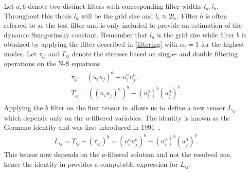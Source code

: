 Let $a,b$ denote two distinct filters with corresponding filter widths $l_a,l_b$. 
Throughout this thesis $l_a$ will be the grid size and $l_b\approx 2l_a$. Filter $b$ is
often referred to as the test filter and is only included to provide an estimation 
of the dynamic Smagorinsky constant. Remember that $l_a$ is the grid size while 
filter $b$ is obtained by applying the filter described in \cref{filtering} with $\alpha_i=1$ for the highest modes.
Let $\tau_{ij}$ and $T_{ij}$ denote the stresses based on single- and double filtering
operations on the N-S equations
\begin{align}
    \begin{split}
    \tau_{ij} = (u_iu_j)^a - u_i^au_j^a,\\
    T_{ij} = ((u_iu_j)^a)^b - (u_i^a)^b(u_j^a)^b.
    \end{split}
    \label{eq:stresstensors}
\end{align}
Applying the $b$ filter on the first tensor in  allows us to define 
a new tensor $L_{ij}$ which depends only on the $a$-filtered variables. The identity 
is known as the Germano identity and was first introduced in 1991~\cite{Germano91},
\begin{align}
    L_{ij} = T_{ij} - (\tau_{ij})^b
    = (u_i^au_j^a)^b - (u_i^a)^b(u_j^a)^b.
    \label{eq:germanoid}
\end{align}
This tensor now depends on the $a$-filtered solution and not the resolved 
one, hence the identity in  provides a computable expression for $L_{ij}$.

